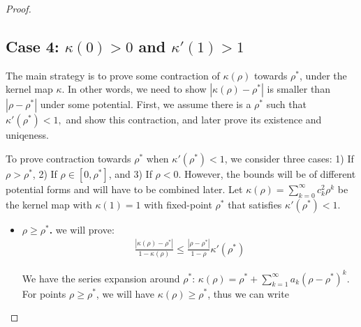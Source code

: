 \begin{proof}
\subsection*{Case 4: $\kappa(0)>0$ and $\kappa'(1)>1$}
The main strategy is to prove some contraction of $\kappa(\rho)$ towards $\rho^*$, under the kernel map $\kappa$. In other words, we need to show $|\kappa(\rho)-\rho^*|$ is smaller than $|\rho-\rho^*|$ under some potential. First, we assume there is a $\rho^*$ such that $\kappa'(\rho^*)<1,$ and show this contraction, and later prove its existence and uniqeness. 

To prove contraction towards $\rho^*$ when $\kappa'(\rho^*)<1$, we consider three cases: 1) If $\rho > \rho^*$, 2) If $\rho \in [0,\rho^*]$, and 3) If $\rho < 0$. However, the bounds will be of different potential forms and will have to be combined later.  Let $\kappa(\rho) = \sum_{k=0}^\infty c_k^2 \rho^k$ be the kernel map with $\kappa(1)= 1$ with fixed-point $\rho^*$ that satisfies $\kappa'(\rho^*)<1.$

\begin{itemize}
\item \textbf{$\rho\ge \rho^*$.} we will prove:
\begin{align*}
\frac{|\kappa(\rho)-\rho^*|}{1-\kappa(\rho)} \le \frac{|\rho-\rho^*|}{1-\rho} \kappa'(\rho^*)
\end{align*}

We have the series expansion around $\rho^*$: $\kappa(\rho) = \rho^* + \sum_{k=1}^\infty a_k (\rho-\rho^*)^k$. For points $\rho\ge \rho^*$, we will have $\kappa(\rho)\ge \rho^*$, thus we can write


\end{itemize}
\end{proof}
